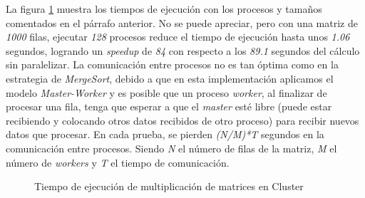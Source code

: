 		La figura \ref{fig:mult_matrices_cluster} muestra los tiempos de ejecución con los procesos y tamaños comentados en el párrafo anterior. No se puede apreciar, pero con una matriz de \textit{1000} filas, ejecutar \textit{128} procesos reduce el tiempo de ejecución hasta unos \textit{1.06} segundos, logrando un \textit{speedup} de \textit{84} con respecto a los \textit{89.1} segundos del cálculo sin paralelizar. La comunicación entre procesos no es tan óptima como en la estrategia de \textit{MergeSort}, debido a que en esta implementación aplicamos el modelo \textit{Master-Worker} y es posible que un proceso \textit{worker}, al finalizar de procesar una fila, tenga que esperar a que el \textit{master} esté libre (puede estar recibiendo y colocando otros datos recibidos de otro proceso) para recibir nuevos datos que procesar. En cada prueba, se pierden \textit{(N/M)*T} segundos en la comunicación entre procesos. Siendo \textit{N} el número de filas de la matriz, \textit{M} el número de \textit{workers} y \textit{T} el tiempo de comunicación.

		\begin{figure}[!h]
			\hspace{-0.07\textwidth} 
			\caption{Tiempo de ejecución de multiplicación de matrices en Cluster}
			\label{fig:mult_matrices_cluster}
		\end{figure}
		
